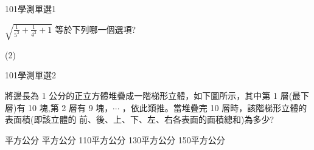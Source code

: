 \begin{QUESTIONS}
    \begin{QUESTION}
        \begin{ExamInfo}{101}{學測}{單選}{1}
        \end{ExamInfo}
        \begin{ExamAnsRateInfo}{77}{98}{89}{44}
        \end{ExamAnsRateInfo}
        \begin{QBODY}
            $\sqrt{\frac{1}{5^2}+\frac{1}{4^2}+1}$ 等於下列哪一個選項? 
			\begin{QOPS} 
			\end{QOPS}
        \end{QBODY}
        \begin{QFROMS}
        \end{QFROMS}
        \begin{QTAGS}\end{QTAGS}
        \begin{QANS}
            (2)
        \end{QANS}
        \begin{QSOLLIST}
        \end{QSOLLIST}
        \begin{QEMPTYSPACE}
        \end{QEMPTYSPACE}
    \end{QUESTION}
    \begin{QUESTION}
        \begin{ExamInfo}{101}{學測}{單選}{2}
        \end{ExamInfo}
        \begin{ExamAnsRateInfo}{87}{99}{98}{64}
        \end{ExamAnsRateInfo}
        \begin{QBODY}
            將邊長為 1 公分的正立方體堆疊成一階梯形立體，如下圖所示，其中第 1 層(最下層)有 10 塊,第 2 層有 9 塊，$\cdots$ ，依此類推。當堆疊完 10 層時，該階梯形立體的表面積(即該立體的 前、後、上、下、左、右各表面的面積總和)為多少?
			\begin{QOPS}
				\QOP 75 平方公分 
				\QOP 90 平方公分 
				\QOP 110平方公分 
				\QOP 130平方公分 
				\QOP 150平方公分
			\end{QOPS}
			

\end{QBODY}
\end{QUESTION}
\end{QUESTIONS}
